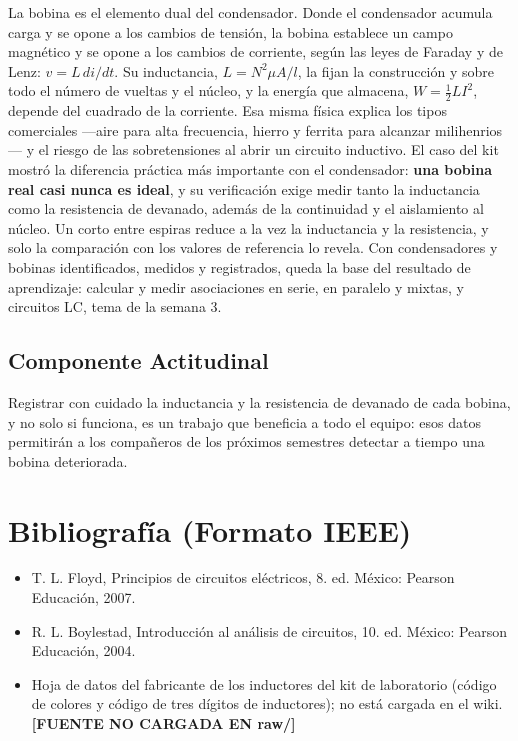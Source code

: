 \documentclass[11pt,letterpaper]{article}
\begin{document}
La bobina es el elemento dual del condensador. Donde el condensador acumula carga y se opone a los cambios de tensión, la bobina establece un campo magnético y se opone a los cambios de corriente, según las leyes de Faraday y de Lenz: $v = L\,di/dt$. Su inductancia, $L = N^2 \mu A / l$, la fijan la construcción y sobre todo el número de vueltas y el núcleo, y la energía que almacena, $W = \tfrac{1}{2}LI^2$, depende del cuadrado de la corriente. Esa misma física explica los tipos comerciales ---aire para alta frecuencia, hierro y ferrita para alcanzar milihenrios--- y el riesgo de las sobretensiones al abrir un circuito inductivo. El caso del kit mostró la diferencia práctica más importante con el condensador: \textbf{una bobina real casi nunca es ideal}, y su verificación exige medir tanto la inductancia como la resistencia de devanado, además de la continuidad y el aislamiento al núcleo. Un corto entre espiras reduce a la vez la inductancia y la resistencia, y solo la comparación con los valores de referencia lo revela. Con condensadores y bobinas identificados, medidos y registrados, queda la base del resultado de aprendizaje: calcular y medir asociaciones en serie, en paralelo y mixtas, y circuitos LC, tema de la semana 3.

\subsection*{Componente Actitudinal}

\begin{cita}
Registrar con cuidado la inductancia y la resistencia de devanado de cada bobina, y no solo si funciona, es un trabajo que beneficia a todo el equipo: esos datos permitirán a los compañeros de los próximos semestres detectar a tiempo una bobina deteriorada.
\end{cita}

\section{Bibliografía (Formato IEEE)}

{\sloppy
\begin{itemize}[leftmargin=2.6em, labelwidth=2.2em, labelsep=0.4em, align=left]
  \item[{[1]}] T. L. Floyd, Principios de circuitos eléctricos, 8.\textordfeminine{} ed. México: Pearson Educación, 2007.
  \item[{[2]}] R. L. Boylestad, Introducción al análisis de circuitos, 10.\textordfeminine{} ed. México: Pearson Educación, 2004.
  \item[{[3]}] Hoja de datos del fabricante de los inductores del kit de laboratorio (código de colores y código de tres dígitos de inductores); no está cargada en el wiki. \textcolor{iuborange}{\textbf{[FUENTE NO CARGADA EN raw/]}}
\end{itemize}
}
\end{document}
